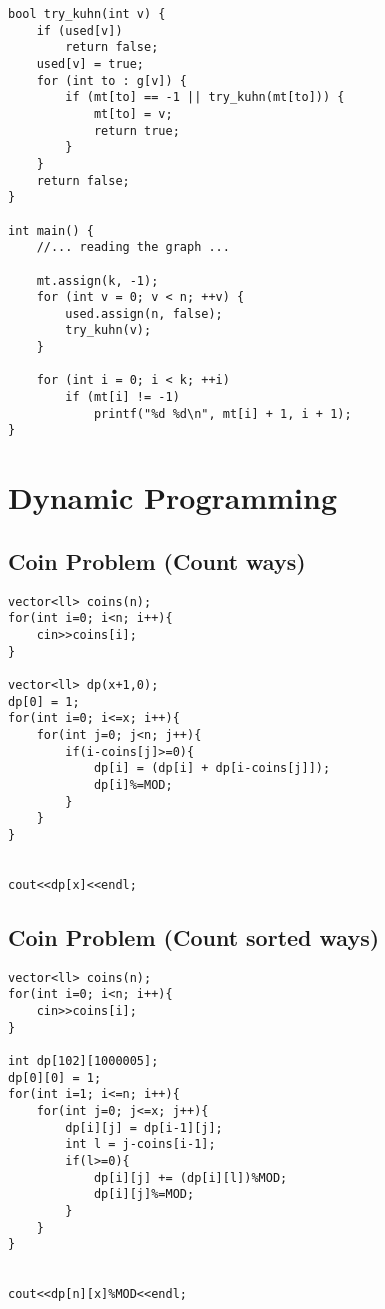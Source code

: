\documentclass[10pt]{article}
\begin{document}
\begin{multicols*}{2}
\begin{lstlisting}[style=compactcpp]
bool try_kuhn(int v) {
    if (used[v])
        return false;
    used[v] = true;
    for (int to : g[v]) {
        if (mt[to] == -1 || try_kuhn(mt[to])) {
            mt[to] = v;
            return true;
        }
    }
    return false;
}

int main() {
    //... reading the graph ...

    mt.assign(k, -1);
    for (int v = 0; v < n; ++v) {
        used.assign(n, false);
        try_kuhn(v);
    }

    for (int i = 0; i < k; ++i)
        if (mt[i] != -1)
            printf("%d %d\n", mt[i] + 1, i + 1);
}
\end{lstlisting}

\section{Dynamic Programming}

\subsection{Coin Problem (Count ways)}

\begin{lstlisting}[style=compactcpp]
vector<ll> coins(n);
for(int i=0; i<n; i++){
    cin>>coins[i];
}
    
vector<ll> dp(x+1,0);
dp[0] = 1;
for(int i=0; i<=x; i++){
    for(int j=0; j<n; j++){
        if(i-coins[j]>=0){
            dp[i] = (dp[i] + dp[i-coins[j]]);
            dp[i]%=MOD;
        }
    }
}
        
        
cout<<dp[x]<<endl;
\end{lstlisting}

\subsection{Coin Problem (Count sorted ways)}

\begin{lstlisting}[style=compactcpp]
vector<ll> coins(n);
for(int i=0; i<n; i++){
    cin>>coins[i];
}
    
int dp[102][1000005];
dp[0][0] = 1;
for(int i=1; i<=n; i++){
    for(int j=0; j<=x; j++){
        dp[i][j] = dp[i-1][j];
        int l = j-coins[i-1];
        if(l>=0){
            dp[i][j] += (dp[i][l])%MOD;
            dp[i][j]%=MOD;
        }
    }
}
        
        
cout<<dp[n][x]%MOD<<endl;
\end{lstlisting}


\end{multicols*}
\end{document}
